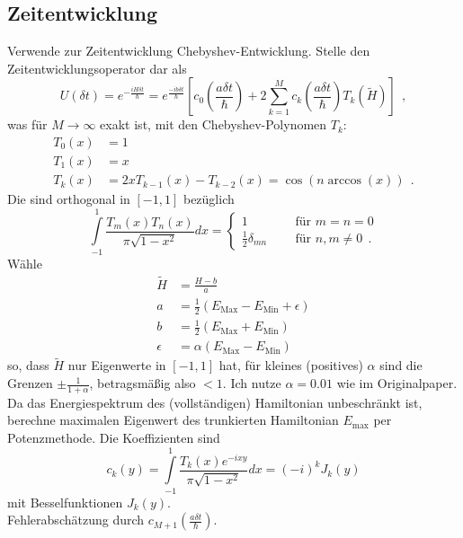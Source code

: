 \subsection{Zeitentwicklung}
Verwende zur Zeitentwicklung Chebyshev-Entwicklung.
Stelle den Zeitentwicklungsoperator dar als
\begin{equation}
 U(\delta t) = e^{-\frac{i H \delta t}{\hbar}} = e^{\frac{-ib\delta t}{\hbar}}\left[ c_0(\frac{a\delta t}{\hbar}) + 2\sum\limits_{k=1}^{M} c_k(\frac{a\delta t}{\hbar})T_k(\tilde H)\right]~~,
\end{equation}
was für $M\rightarrow\infty$ exakt ist, mit den Chebyshev-Polynomen $T_k$:
\begin{align}
  T_0(x) &= 1\\
  T_1(x) &= x\\
  T_k(x) &= 2xT_{k-1}(x) - T_{k-2}(x) = \cos(n\arccos(x))~~.
\end{align}
Die sind orthogonal in $[-1,1]$ bezüglich
\begin{equation}
 \int\limits_{-1}^{1} \frac{T_m(x)T_n(x)}{\pi\sqrt{1-x^2}}dx = 
\begin{cases}
    1 ~~~~~&\text{ für }m=n=0\\
    \frac{1}{2}\delta_{mn} ~~~~~&\text{ für }n,m\neq 0~~.
  \end{cases}
\end{equation}
Wähle 
\begin{align}
 \tilde H &= \frac{H-b}{a}\\
  a &= \frac{1}{2}(E_\text{Max} - E_\text{Min} +  \epsilon)\\
  b &= \frac{1}{2}(E_\text{Max} + E_\text{Min})\\
  \epsilon &= \alpha(E_\text{Max} - E_\text{Min})~~
\end{align}
so, dass $\tilde H$ nur Eigenwerte in $[-1,1]$ hat, für kleines (positives) $\alpha$ sind die Grenzen $\pm \frac{1}{1+\alpha}$, betragsmäßig also $<1$.
Ich nutze $\alpha = 0.01$ wie im Originalpaper. 
Da das Energiespektrum des (vollständigen) Hamiltonian unbeschränkt ist, berechne maximalen Eigenwert des trunkierten Hamiltonian $E_\text{max}$ per \linebreak Potenzmethode. 
Die Koeffizienten sind
\begin{equation}
 c_k (y) = \int\limits_{-1}^{1}\frac{T_k(x)e^{-ixy}}{\pi\sqrt{1-x^2}}dx = (-i)^k J_k(y)
\end{equation}
mit Besselfunktionen $J_k(y)$.\\
Fehlerabschätzung durch $c_{M+1}(\frac{a\delta t}{\hbar})$.\\
